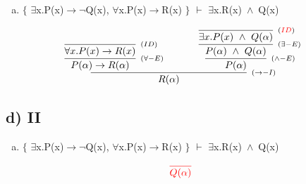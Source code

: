 \documentclass[aspectratio=43]{beamer}
\newcommand{\ria}{$\rightarrow$}
\newcommand{\fall}{$\forall$}
\newcommand{\ex}{$\exists$}
\newcommand{\nao}{$\neg$}
\newcommand{\andd}{$\wedge$}
\begin{document}
    \begin{frame}[fragile]
    
    	\begin{enumerate}[d)]
			\item $\{$ \ex x.P(x)\ria \nao Q(x), \fall x.P(x)\ria R(x) $\}$ $\vdash$ \ex x.R(x)\ \andd\ Q(x) \\
		\end{enumerate}
        
        \vspace{65pt}
        
        \[
        \begin{array}{c}
		
        	\infer[_{(\to -I)}]
            	{R(\alpha)}
            	{\infer[_{(\forall -E)}]
                	{P(\alpha) \rightarrow R(\alpha)} 
                    {\infer[_{(ID)}]
                    	{\forall x.P(x)\to R(x)}
                    	{}
                    }  
            	\hspace{35pt}
                \infer[_{(\land -E)}] 
                	{P(\alpha)}
                    {\infer[_{(\exists -E)}]
                    	{P(\alpha)\ \land \ Q(\alpha)}
                    	{\infer[_{(\textcolor{red}{ID})}]
                        	{\exists x.P(x)\ \land \ Q(\alpha)}
                            {}
                        }
                    }
                }
		\end{array}
        \]
        
	\end{frame}
    
    \subsection{d) II}
    
    \begin{frame}[fragile]
    
    	\begin{enumerate}[d)]
			\item $\{$ \ex x.P(x)\ria \nao Q(x), \fall x.P(x)\ria R(x) $\}$ $\vdash$ \ex x.R(x)\ \andd\ Q(x) \\
		\end{enumerate}
        
        \vspace{75pt}
        
        \[
        \begin{array}{c}
		
        	\textcolor{red}{
            \infer[_{}]
            	{Q(\alpha)}
            	{}
        	}
		\end{array}
        \]
        
	\end{frame}
    
\end{document}
